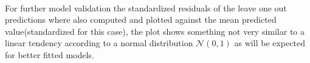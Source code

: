 \paragraph{}
For further model validation the standardized residuals of the leave one out
predictions where also computed and plotted against the mean predicted
value(standardized for this case), the plot shows something not very similar to
a linear tendency according to a normal distribution $\mathcal{N}(0,1)$ as will
be expected for better fitted models.